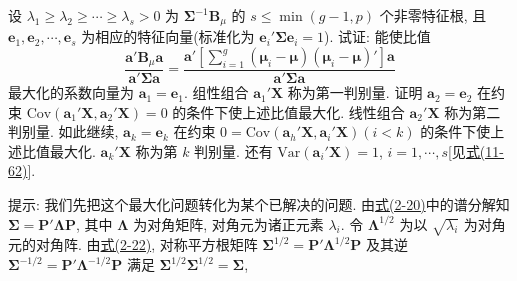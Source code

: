 \quad 设 $\lambda_1\ge\lambda_2\ge\cdots\ge\lambda_s>0$ 为 $\boldsymbol{\Sigma}^{-1}\mathbf{B}_\mu$ 的 $s\le\min(g-1,p)$ 个非零特征根, 且 $\mathbf{e}_1,\mathbf{e}_2,\cdots,\mathbf{e}_s$ 为相应的特征向量(标准化为 $\mathbf{e}_i'\boldsymbol{\Sigma}\mathbf{e}_i=1$). 试证: 能使比值
\[
\frac{\mathbf{a}'\mathbf{B}_\mu\mathbf{a}}{\mathbf{a}'\boldsymbol{\Sigma}\mathbf{a}}=\frac{\mathbf{a}'\left[\sum_{i=1}^{g}(\boldsymbol{\mu}_i-\boldsymbol{\mu})(\boldsymbol{\mu}_i-\boldsymbol{\mu})'\right]\mathbf{a}}{\mathbf{a}'\boldsymbol{\Sigma}\mathbf{a}}
\]
最大化的系数向量为 $\mathbf{a}_1=\mathbf{e}_1$. 组性组合 $\mathbf{a}_1'\mathbf{X}$ 称为第一判别量. 证明 $\mathbf{a}_2=\mathbf{e}_2$ 在约束 $\mathrm{Cov}(\mathbf{a}_1'\mathbf{X},\mathbf{a}_2'\mathbf{X})=0$ 的条件下使上述比值最大化. 线性组合 $\mathbf{a}_2'\mathbf{X}$ 称为第二判别量. 如此继续, $\mathbf{a}_k=\mathbf{e}_k$ 在约束 $0=\mathrm{Cov}(\mathbf{a}_h'\mathbf{X},\mathbf{a}_i'\mathbf{X})(i<k)$ 的条件下使上述比值最大化. $\mathbf{a}_k'\mathbf{X}$ 称为第 $k$ 判别量. 还有 $\mathrm{Var}(\mathbf{a}_i'\mathbf{X})=1$, $i=1,\cdots,s$[见\hyperref[eq:11-62]{式(11-62)}].

提示: 我们先把这个最大化问题转化为某个已解决的问题. 由\hyperref[eq:2-20]{式(2-20)}中的谱分解知 $\boldsymbol{\Sigma}=\mathbf{P}'\boldsymbol{\Lambda}\mathbf{P}$, 其中 $\boldsymbol{\Lambda}$ 为对角矩阵, 对角元为诸正元素 $\lambda_i$. 令 $\boldsymbol{\Lambda}^{1/2}$ 为以 $\sqrt{\lambda_i}$ 为对角元的对角阵. 由\hyperref[eq:2-22]{式(2-22)}, 对称平方根矩阵 $\boldsymbol{\Sigma}^{1/2}=\mathbf{P}'\boldsymbol{\Lambda}^{1/2}\mathbf{P}$ 及其逆 $\boldsymbol{\Sigma}^{-1/2}=\mathbf{P}'\boldsymbol{\Lambda}^{-1/2}\mathbf{P}$ 满足 $\boldsymbol{\Sigma}^{1/2}\boldsymbol{\Sigma}^{1/2}=\boldsymbol{\Sigma}$,
